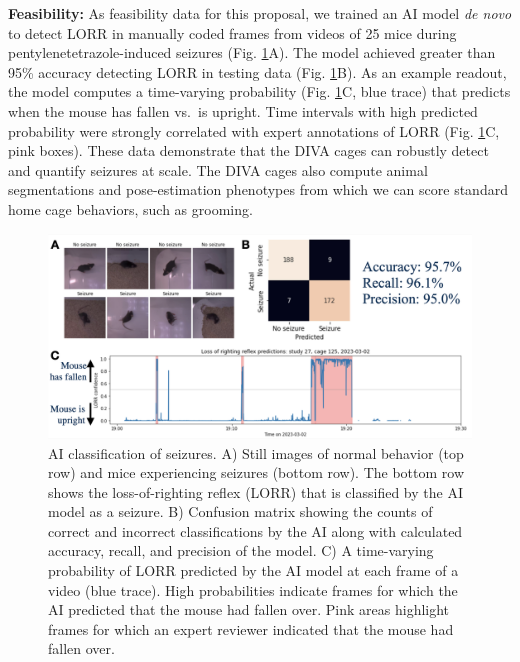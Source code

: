 \documentclass[
  12pt,
]{article}
\begin{document}
\pagebreak

\textbf{Feasibility:} As feasibility data for this proposal, we trained
an AI model \textit{de novo} to detect LORR in manually coded frames
from videos of 25 mice during pentylenetetrazole-induced seizures (Fig.
\ref{fig:LORR}A). The model achieved greater than 95\% accuracy
detecting LORR in testing data (Fig. \ref{fig:LORR}B). As an example
readout, the model computes a time-varying probability (Fig.
\ref{fig:LORR}C, blue trace) that predicts when the mouse has fallen
vs.~is upright. Time intervals with high predicted probability were
strongly correlated with expert annotations of LORR (Fig.
\ref{fig:LORR}C, pink boxes). These data demonstrate that the DIVA cages
can robustly detect and quantify seizures at scale. The DIVA cages also
compute animal segmentations and pose-estimation phenotypes from which
we can score standard home cage behaviors, such as grooming.

\begin{figure}[ht!]
\includegraphics[width=\textwidth]{Fig3.png} 
\caption{AI classification of seizures. A) Still images of normal behavior (top row) and mice experiencing seizures (bottom row). The bottom row shows the loss-of-righting reflex (LORR) that is classified by the AI model as a seizure. B) Confusion matrix showing the counts of correct and incorrect classifications by the AI along with calculated accuracy, recall, and precision of the model. C) A time-varying probability of LORR predicted by the AI model at each frame of a video (blue trace). High probabilities indicate frames for which the AI predicted that the mouse had fallen over. Pink areas highlight frames for which an expert reviewer indicated that the mouse had fallen over.}
\label{fig:LORR}
\end{figure}
\end{document}
